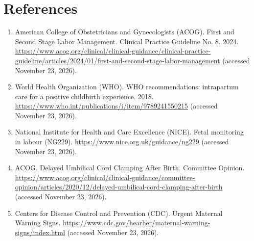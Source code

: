 \section*{References}
\begin{enumerate}
  \item American College of Obstetricians and Gynecologists (ACOG). First and Second Stage Labor Management. Clinical Practice Guideline No. 8. 2024. \url{https://www.acog.org/clinical/clinical-guidance/clinical-practice-guideline/articles/2024/01/first-and-second-stage-labor-management} (accessed November 23, 2026).
  \item World Health Organization (WHO). WHO recommendations: intrapartum care for a positive childbirth experience. 2018. \url{https://www.who.int/publications/i/item/9789241550215} (accessed November 23, 2026).
  \item National Institute for Health and Care Excellence (NICE). Fetal monitoring in labour (NG229). \url{https://www.nice.org.uk/guidance/ng229} (accessed November 23, 2026).
  \item ACOG. Delayed Umbilical Cord Clamping After Birth. Committee Opinion. \url{https://www.acog.org/clinical/clinical-guidance/committee-opinion/articles/2020/12/delayed-umbilical-cord-clamping-after-birth} (accessed November 23, 2026).
  \item Centers for Disease Control and Prevention (CDC). Urgent Maternal Warning Signs. \url{https://www.cdc.gov/hearher/maternal-warning-signs/index.html} (accessed November 23, 2026).
\end{enumerate}

\clearpage
